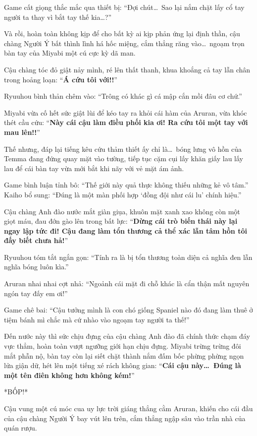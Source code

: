 \documentclass[../main.tex]{subfiles}
\begin{document}
Game cất giọng thắc mắc qua thiết bị: ``Đợi chút\dots\ Sao lại nắm chặt lấy cổ tay người ta thay vì bắt tay thế kia\dots?''

Và rồi, hoàn toàn không kịp để cho bất kỳ ai kịp phản ứng lại định thần, cậu chàng Người Ý bất thình lình há hốc miệng, cắm thẳng răng vào\dots\ ngoạm trọn bàn tay của Miyabi một cú cực kỳ dã man.


Cậu chàng tóc đỏ giật nảy mình, ré lên thất thanh, khua khoắng cả tay lẫn chân trong hoảng loạn: ``\textbf{Á cứu tôi với!!}''

Ryuuhou bình thản chêm vào: ``Trông có khác gì cá mập cắn mồi đâu cơ chứ.''

Miyabi vừa cố hết sức giật lùi để kéo tay ra khỏi cái hàm của Aruran, vừa khóc thét cầu cứu: ``\textbf{Này cái cậu làm điều phối kia ơi! Ra cứu tôi một tay với mau lên!!}''

Thế nhưng, đáp lại tiếng kêu cứu thảm thiết ấy chỉ là\dots\ bóng lưng vô hồn của Temma đang đứng quay mặt vào tường, tiếp tục cặm cụi lấy khăn giấy lau lấy lau để cái bàn tay vừa mới bắt khi nãy với vẻ mặt ám ảnh.

Game bình luận tỉnh bô: ``Thế giới này quả thực không thiếu những kẻ vô tâm.'' Kaiho bổ sung: ``Đúng là một màn phối hợp `đồng đội như cái lu' chính hiệu.''

Cậu chàng Anh đào nước mắt giàn giụa, khuôn mặt xanh xao không còn một giọt máu, đau đớn gào lên trong bất lực: ``\textbf{Dừng cái trò biến thái này lại ngay lập tức đi! Cậu đang làm tổn thương cả thể xác lẫn tâm hồn tôi đấy biết chưa hả!}''

Ryuuhou tóm tắt ngắn gọn: ``Tính ra là bị tổn thương toàn diện cả nghĩa đen lẫn nghĩa bóng luôn kìa.''

Aruran nhai nhai cợt nhả: ``Ngoảnh cái mặt đi chỗ khác là cẩn thận mất nguyên ngón tay đấy em ơi!''

Game chê bai: ``Cậu tưởng mình là con chó giống Spaniel nào đó đang làm thuê ở tiệm bánh mì chắc mà cứ nhào vào ngoạm tay người ta thế!''

Đến nước này thì sức chịu đựng của cậu chàng Anh đào đã chính thức chạm đáy vực thẳm, hoàn toàn vượt ngưỡng giới hạn chịu đựng. Miyabi trừng trừng đôi mắt phẫn nộ, bàn tay còn lại siết chặt thành nắm đấm bốc phừng phừng ngọn lửa giận dữ, hét lên một tiếng xé rách không gian: ``\textbf{Cái cậu này\dots\ Đúng là một tên điên không hơn không kém!}''

*BỐP!*

Cậu vung một cú móc cua uy lực trời giáng thẳng cằm Aruran, khiến cho cái đầu của cậu chàng Người Ý bay vút lên trên, cắm thẳng ngập sâu vào trần nhà của quán rượu.
\end{document}
